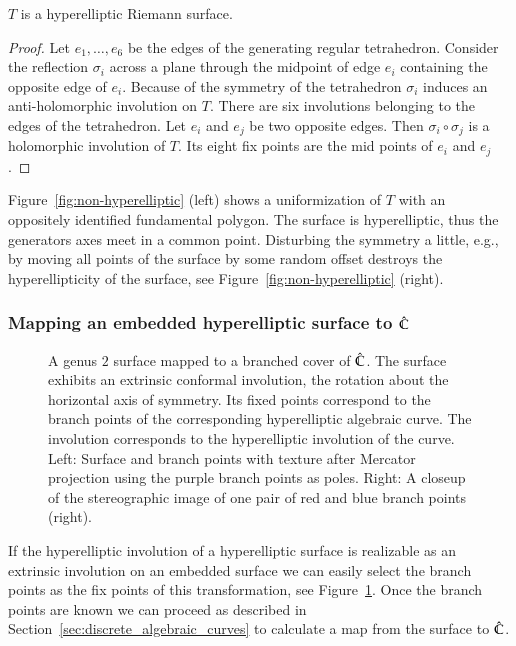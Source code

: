 \documentclass[Thesis]{subfiles}
\begin{document}
\begin{theorem}
$T$ is a hyperelliptic Riemann surface.
\begin{proof}
Let $e_1,\ldots,e_6$ be the edges of the generating regular tetrahedron. Consider the reflection $\sigma_i$ across a plane through the midpoint of edge $e_i$ containing the opposite edge of $e_i$.  Because of the symmetry of the tetrahedron $\sigma_i$ induces an anti-holomorphic involution on $T$. There are six involutions belonging to the edges of the tetrahedron. Let $e_i$ and $e_j$ be two opposite edges. Then $\sigma_i \circ \sigma_j$ is a holomorphic involution of $T$. Its eight fix points are the mid points of $e_i$ and $e_j$.
\end{proof}
\end{theorem}

Figure~\ref{fig:non-hyperelliptic} (left) shows a uniformization of $T$ with an oppositely identified fundamental polygon. The surface is hyperelliptic, thus the generators axes meet in a common point. Disturbing the symmetry a little, e.g., by moving all points of the surface by some random offset destroys the hyperellipticity of the surface, see Figure~\ref{fig:non-hyperelliptic} (right).

\subsubsection{Mapping an embedded hyperelliptic surface to $\hat{\mathbb C}$}

\begin{figure} 
\centering
{}
\caption{
A genus $2$ surface mapped to a branched cover of $\hat{\mathbb C}$. 
The surface exhibits an extrinsic conformal involution, the rotation about the horizontal axis of symmetry. 
Its fixed points correspond to the branch points of the corresponding hyperelliptic algebraic curve.
The involution corresponds to the hyperelliptic involution of the curve.  
Left: Surface and branch points with texture after Mercator projection using the purple
branch points as poles. 
Right: A closeup of the stereographic image of one pair of red and blue branch points (right).
} 
\label{fig:genus2_branched} 
\end{figure}

If the hyperelliptic involution of a hyperelliptic surface is realizable as an extrinsic involution on an embedded surface we can easily select the branch points as the fix points of this transformation, see Figure~\ref{fig:genus2_branched}. 
Once the branch points are known we can proceed as described in Section~\ref{sec:discrete_algebraic_curves} to calculate a map from the surface to $\hat{\mathbb C}$.
\end{document}
